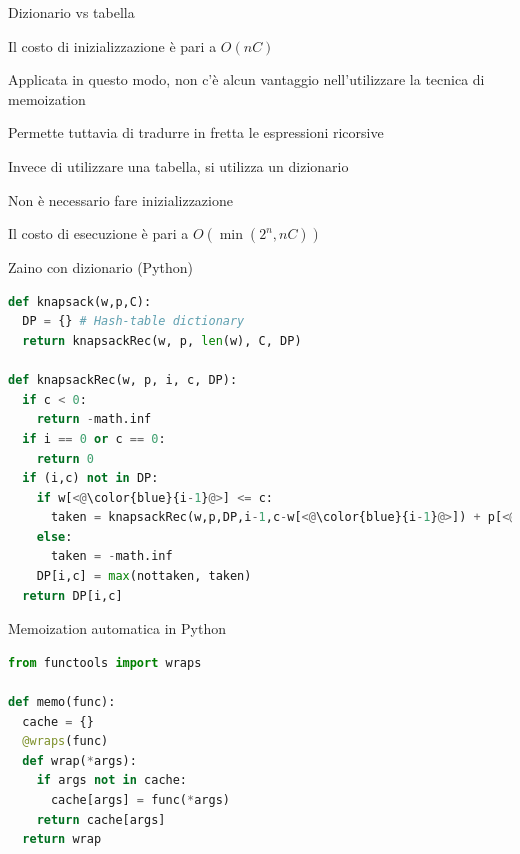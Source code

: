 \begin{frame}{Dizionario vs tabella}

  \BIL
  \item Il costo di inizializzazione è pari a $O(nC)$
  \item Applicata in questo modo, non c'è alcun vantaggio nell'utilizzare
  la tecnica di memoization
  \item Permette tuttavia di tradurre in fretta le espressioni ricorsive
  \EIL

\pause
{}
  \BIL
  \item Invece di utilizzare una tabella, si utilizza un dizionario
  \item Non è necessario fare inizializzazione
  \item Il costo di esecuzione è pari a $O(\min(2^n,nC))$
  \EIL

\end{frame}

\begin{frame}[fragile,shrink=5]{Zaino con dizionario (Python)}

\vspace{-12pt}
\begin{lstlisting}[language=python,tabsize=3]
def knapsack(w,p,C):
  DP = {} # Hash-table dictionary
  return knapsackRec(w, p, len(w), C, DP)

def knapsackRec(w, p, i, c, DP):
  if c < 0:
    return -math.inf
  if i == 0 or c == 0:
    return 0
  if (i,c) not in DP:
    if w[<@\color{blue}{i-1}@>] <= c:
      taken = knapsackRec(w,p,DP,i-1,c-w[<@\color{blue}{i-1}@>]) + p[<@\color{blue}{i-1}@>]
    else:
      taken = -math.inf
    DP[i,c] = max(nottaken, taken) 
  return DP[i,c]
\end{lstlisting}

\end{frame}

\begin{frame}[fragile]{Memoization automatica in Python}


\begin{lstlisting}[language=python]
from functools import wraps

def memo(func):
  cache = {}
  @wraps(func)
  def wrap(*args):
    if args not in cache:
      cache[args] = func(*args)
    return cache[args]
  return wrap
\end{lstlisting}


\end{frame}

